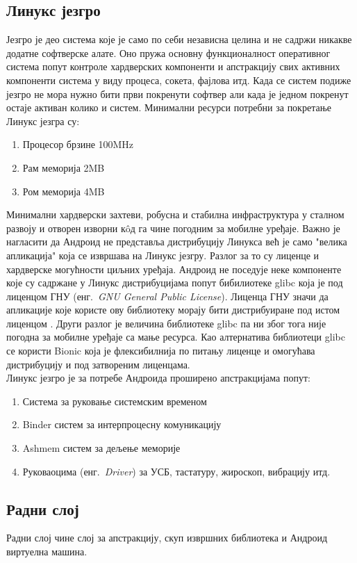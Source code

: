 \documentclass[12pt,oneside]{memoir}
\theoremstyle{remark}
\begin{document}
\subsection{Линукс језгро}
Језгро је део система које је само по себи независна целина и не садржи никакве додатне софтверске алате.  Оно пружа основну функционалност оперативног система попут контроле хардверских компоненти и апстракцију свих активних компоненти система у виду процеса, сокета, фајлова итд. Када се систем подиже језгро не мора нужно бити први покренути софтвер али када је једном покренут остаје активан колико и систем. Минимални ресурси потребни за покретање Линукс језгра су:
\begin{enumerate}
\item Процесор брзине 100MHz
\item Рам меморија 2MB
\item Ром меморија 4MB
\end{enumerate}
Минимални хардверски захтеви, робусна и стабилна инфраструктура у сталном развоју и отворен изворни к\^{o}д га чине погодним за мобилне уређаје. Важно је нагласити да Андроид не представља дистрибуцију Линукса већ је само "велика апликација" која се извршава на Линукс језгру. Разлог за то су лиценце и хардверске могућности циљних уређаја. Андроид не поседује неке компоненте које су садржане у Линукс дистрибуцијама попут бибилиотеке glibc која је под лиценцом ГНУ  (енг.~{\em GNU General Public License}). Лиценца ГНУ значи да апликације које користе ову библиотеку морају бити дистрибуиране под истом лиценцом \cite{gnulicence}. Други разлог је величина библиотеке glibc па ни због тога није погодна за мобилне уређаје са мање ресурса. Као алтернатива библиотеци glibc се користи Bionic која је флексибилнија по питању лиценце и омогућава дистрибуцију и под затвореним лиценцама.\\
Линукс језгро је за потребе Андроида проширено апстракцијама попут:

\begin{enumerate}
\item Система за руковање системским временом
\item Binder систем за интерпроцесну комуникацију
\item Ashmem систем за дељење меморије
\item Руковаоцима (енг.~{\em Driver}) за УСБ, тастатуру, жироскоп, вибрацију итд.
\end{enumerate}

\subsection{Радни слој}
Радни слој чине слој за апстракцију, скуп извршних библиотека и Андроид виртуелна машина.
\end{document}
